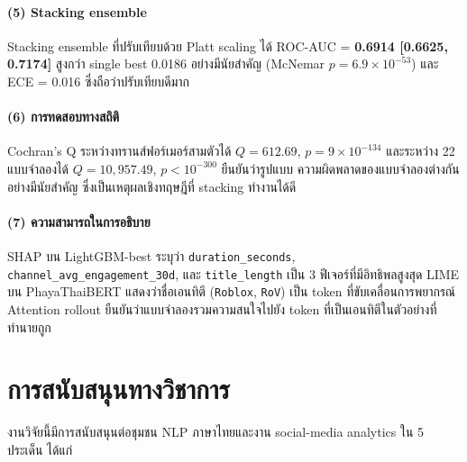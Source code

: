 \paragraph{(5) Stacking ensemble}
Stacking ensemble ที่ปรับเทียบด้วย Platt scaling ได้ ROC-AUC = \textbf{0.6914
[0.6625, 0.7174]} สูงกว่า single best 0.0186 อย่างมีนัยสำคัญ (McNemar
$p = 6.9 \!\times\! 10^{-53}$) และ ECE = 0.016 ซึ่งถือว่าปรับเทียบดีมาก

\paragraph{(6) การทดสอบทางสถิติ}
Cochran's Q ระหว่างทรานส์ฟอร์เมอร์สามตัวได้ $Q = 612.69$, $p = 9\!\times\!10^{-134}$
และระหว่าง 22 แบบจำลองได้ $Q = 10{,}957.49$, $p < 10^{-300}$ ยืนยันว่ารูปแบบ
ความผิดพลาดของแบบจำลองต่างกันอย่างมีนัยสำคัญ ซึ่งเป็นเหตุผลเชิงทฤษฎีที่ stacking
ทำงานได้ดี

\paragraph{(7) ความสามารถในการอธิบาย}
SHAP บน LightGBM-best ระบุว่า \texttt{duration\_seconds}, \texttt{channel\_avg\_engagement\_30d},
และ \texttt{title\_length} เป็น 3 ฟีเจอร์ที่มีอิทธิพลสูงสุด LIME บน
PhayaThaiBERT แสดงว่าชื่อเอนทิตี (\texttt{Roblox}, \texttt{RoV}) เป็น token
ที่ขับเคลื่อนการพยากรณ์ Attention rollout ยืนยันว่าแบบจำลองรวมความสนใจไปยัง
token ที่เป็นเอนทิตีในตัวอย่างที่ทำนายถูก

\section{การสนับสนุนทางวิชาการ}
\label{sec:conclusion-contributions}

งานวิจัยนี้มีการสนับสนุนต่อชุมชน NLP ภาษาไทยและงาน social-media analytics
ใน 5 ประเด็น ได้แก่

